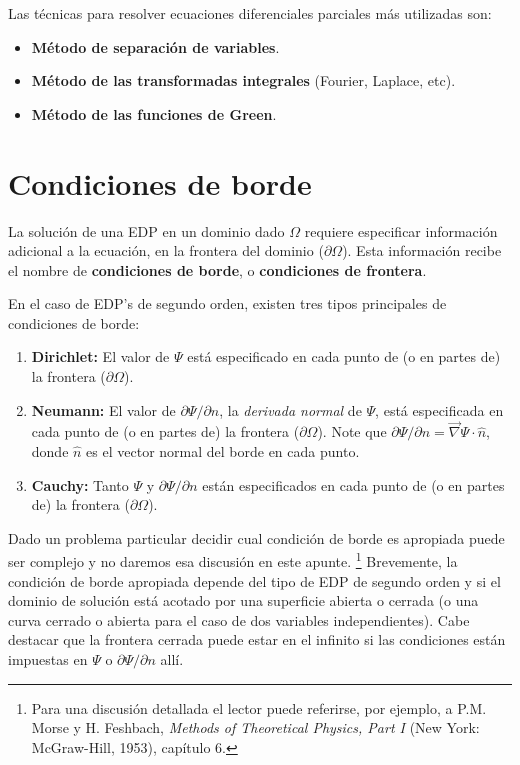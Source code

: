 Las técnicas para resolver ecuaciones diferenciales parciales más utilizadas son: 

\begin{itemize}
    \item \textbf{Método de separación de variables}.
    
    \item \textbf{Método de las transformadas integrales} (Fourier, Laplace, etc).
    
    \item \textbf{Método de las funciones de Green}.
\end{itemize}

\section{Condiciones de borde}

La solución de una EDP en un dominio dado $\Omega$ requiere especificar información adicional a la ecuación, en la frontera del dominio ($\partial \Omega$). Esta información recibe el nombre de \textbf{condiciones de borde}, o \textbf{condiciones de frontera}.

En el caso de EDP's de segundo orden, existen tres tipos principales de condiciones de borde:
\begin{enumerate}
    \item \textbf{Dirichlet:} El valor de $\Psi$ está especificado en cada punto de (o en partes de) la frontera ($\partial \Omega$).
    
    \item \textbf{Neumann:} El valor de $\partial \Psi/\partial n$, la \textit{derivada normal} de $\Psi$, está especificada en cada punto de (o en partes de) la frontera ($\partial \Omega$). Note que $\partial \Psi/\partial n = \Vec{\nabla} \Psi \cdot \hat{n}$, donde $\hat{n}$ es el vector normal del borde en cada punto.
    
    \item \textbf{Cauchy:} Tanto $\Psi$ y $\partial \Psi/\partial n$ están especificados en cada punto de (o en partes de) la frontera ($\partial \Omega$).
\end{enumerate}

Dado un problema particular decidir cual condición de borde es apropiada puede ser complejo y no daremos esa discusión en este apunte. \footnote{Para una discusión detallada el lector puede referirse, por ejemplo, a P.M.  Morse y H. Feshbach, {\em Methods of Theoretical Physics, Part I} (New York: McGraw-Hill, 1953), capítulo 6.} Brevemente, la condición de borde apropiada depende del tipo de EDP de segundo orden y si el dominio de solución está acotado por una superficie abierta o cerrada (o una curva cerrado o abierta para el caso de dos variables independientes). Cabe destacar que la frontera cerrada puede estar en el infinito si las condiciones están impuestas en $\Psi$ o $\partial \Psi/\partial n$ allí.